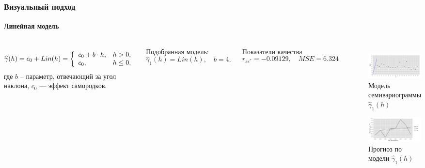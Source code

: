 \documentclass[10pt,pdf,aspectratio=169,hyperref={unicode}]{beamer}
\begin{document}
\begin{frame}
\frametitle{Визуальный подход}
  \framesubtitle{Линейная модель}
  \begin{columns}[c]
  \column{3in}
  \begin{equation}\begin{gathered}
  \label{eq:lin}
    \widehat{\gamma}(h) = c_0 + Lin(h) = \left\{
   \begin{array}{l l}
     c_0 + b \cdot h, & h > 0, \\
     c_0, & h \leq 0,
   \end{array} \right.
  \end{gathered}\end{equation}
  где $ b $ -- параметр, отвечающий за угол наклона, $ c_0 $ --- эффект самородков.

  \vspace{0.5em}

  Подобранная модель:
  \begin{equation}
  \label{eq:gamma1}
    \widehat{\gamma}_1(h) = Lin(h), \quad b = 4,
  \end{equation}

  Показатели качества
  \begin{equation*}
    r_{\varepsilon\varepsilon^{*}} = -0.09129, \quad MSE = 6.324
  \end{equation*}

  \column{3in}
  \vspace{-14.5pt}
  \begin{figure}[H]
    \includegraphics[width=0.9\linewidth]{../../figures/variogram/lin-modeled.png} \\
    \caption{Модель семивариограммы $\widehat{\gamma}_1(h)$}
    \includegraphics[width=0.9\linewidth]{../../figures/variogram/lin-cross-prediction.png}
    \caption{Прогноз по модели $\widehat{\gamma}_1(h)$}
  \end{figure}
  \end{columns}
\end{frame}
\end{document}
